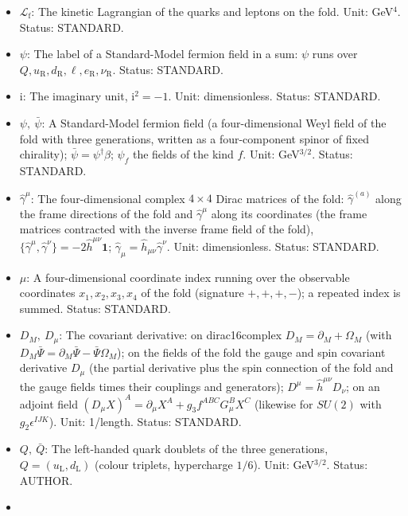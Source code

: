 \documentclass[
  10pt,
]{article}
\providecommand{\tightlist}{%
  \setlength{\itemsep}{0pt}\setlength{\parskip}{0pt}}
\begin{document}
\begin{itemize}
\tightlist
\item
  \(\mathcal{L}_{\mathrm{f}}\): The kinetic Lagrangian of the quarks and
  leptons on the fold. Unit: GeV\(^4\). Status: STANDARD.
\item
  \(\psi\): The label of a Standard-Model fermion field in a sum:
  \(\psi\) runs over
  \(Q, u_{\mathrm{R}}, d_{\mathrm{R}}, \ell, e_{\mathrm{R}}, \nu_{\mathrm{R}}\).
  Status: STANDARD.
\item
  \(\mathrm{i}\): The imaginary unit, \(\mathrm{i}^2 = -1\). Unit:
  dimensionless. Status: STANDARD.
\item
  \(\psi,\ \bar\psi\): A Standard-Model fermion field (a
  four-dimensional Weyl field of the fold with three generations,
  written as a four-component spinor of fixed chirality);
  \(\bar\psi = \psi^\dagger\beta\); \(\psi_f\) the fields of the kind
  \(f\). Unit: GeV\(^{3/2}\). Status: STANDARD.
\item
  \(\hat\gamma^\mu\): The four-dimensional complex \(4 \times 4\) Dirac
  matrices of the fold: \(\hat\gamma^{(a)}\) along the frame directions
  of the fold and \(\hat\gamma^\mu\) along its coordinates (the frame
  matrices contracted with the inverse frame field of the fold),
  \(\{\hat\gamma^\mu, \hat\gamma^\nu\} = -2\hat h^{\mu\nu}\mathbf{1}\);
  \(\hat\gamma_\mu = \hat h_{\mu\nu}\hat\gamma^\nu\). Unit:
  dimensionless. Status: STANDARD.
\item
  \(\mu\): A four-dimensional coordinate index running over the
  observable coordinates \(x_1, x_2, x_3, x_4\) of the fold (signature
  \(+,+,+,-\)); a repeated index is summed. Status: STANDARD.
\item
  \(D_M,\ D_\mu\): The covariant derivative: on dirac16complex
  \(D_M = \partial_M + \Omega_M\) (with
  \(D_M\bar\Psi = \partial_M\bar\Psi - \bar\Psi\Omega_M\)); on the
  fields of the fold the gauge and spin covariant derivative \(D_\mu\)
  (the partial derivative plus the spin connection of the fold and the
  gauge fields times their couplings and generators);
  \(D^\mu = \hat h^{\mu\nu}D_\nu\); on an adjoint field
  \((D_\mu X)^A = \partial_\mu X^A + g_3f^{ABC}G^B_\mu X^C\) (likewise
  for \(SU(2)\) with \(g_2\epsilon^{IJK}\)). Unit: 1/length. Status:
  STANDARD.
\item
  \(Q,\ \bar Q\): The left-handed quark doublets of the three
  generations, \(Q = (u_{\mathrm{L}}, d_{\mathrm{L}})\) (colour
  triplets, hypercharge \(1/6\)). Unit: GeV\(^{3/2}\). Status: AUTHOR.
\item

\end{itemize}
\end{document}

